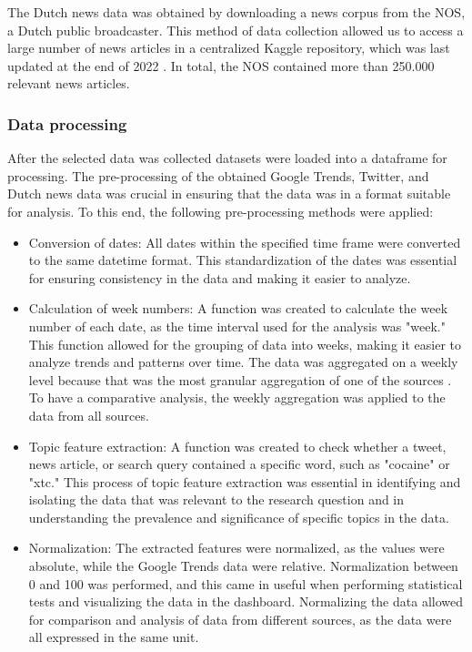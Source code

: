  The Dutch news data was obtained by downloading a news corpus
 from the NOS, a Dutch public broadcaster. This method of data
 collection allowed us to access a large number of news articles
 in a centralized Kaggle repository, which was last updated at
 the end of 2022 \cite{Scheijen}. In total, the NOS contained
 more than 250.000 relevant news articles.

 \subsubsection{Data processing}

 After the selected data was collected datasets were loaded into
 a dataframe for processing. The pre-processing of the obtained
 Google Trends, Twitter, and Dutch news data was crucial in
 ensuring that the data was in a format suitable for analysis.
 To this end, the following pre-processing methods were applied:

\begin{itemize}
  \item Conversion of dates: All dates within the specified time
  frame were converted to the same datetime format. This
  standardization of the dates was essential for ensuring
  consistency in the data and making it easier to analyze.
  \item Calculation of week numbers: A function was created to
  calculate the week number of each date, as the time interval
  used for the analysis was "week." This function allowed for
  the grouping of data into weeks, making it easier to analyze
  trends and patterns over time.  The data was aggregated on a
  weekly level because that was the most granular aggregation of
  one of the sources \cite{GoogleTrends}. To have a comparative
  analysis, the weekly aggregation was applied to the data from
  all sources.
  \item Topic feature extraction: A function was created to
  check whether a tweet, news article, or search query contained
  a specific word, such as "cocaine" or "xtc." This process of
  topic feature extraction was essential in identifying and
  isolating the data that was relevant to the research question
  and in understanding the prevalence and significance of
  specific topics in the data.
  \item Normalization: The extracted features were normalized,
  as the values were absolute, while the Google Trends data were
  relative. Normalization between 0 and 100 was performed, and
  this came in useful when performing statistical tests and
  visualizing the data in the dashboard. Normalizing the data
  allowed for comparison and analysis of data from different
  sources, as the data were all expressed in the same unit.
\end{itemize}

